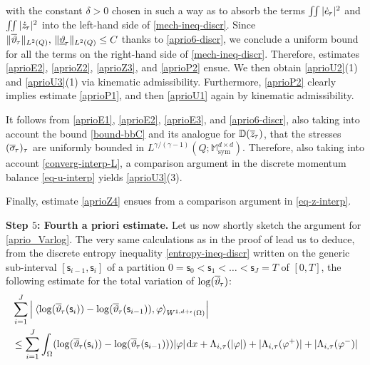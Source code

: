 \documentclass[a4paper,10pt,reqno]{amsart}
\numberwithin{equation}{section}
\newcommand{\bbM}{\mathbb{M}}
\numberwithin{equation}{section}
\def\dd{\;\!\mathrm{d}} %
\newcommand{\pairing}[4]{ \sideset{_{ #1 }}{_{ #2 }}  {\mathop{\langle #3 , #4
\rangle}}}
\newcommand{\teta}{\vartheta}
\newcommand{\piecewiseConstant}[2]{\overline{#1}_{\kern-1pt#2}}
\newcommand{\pwc}{\piecewiseConstant}
\newcommand{\upiecewiseConstant}[2]{\underline{#1}_{\kern-1pt#2}}
\newcommand{\upwc}{\upiecewiseConstant}
\newcommand{\piecewiseLinear}[2]{{#1}_{\kern-1pt#2}}
\newcommand{\pwl}{\piecewiseLinear}
\newcommand{\bbD}{\mathbb{D}}
\newcommand{\mt}{\bbM}
\newcommand{\sym}{\mathrm{sym}}
\newcommand{\EEE}{\color{black}}
\begin{document}
  with the constant $\delta>0$ chosen in such a way as to absorb the terms $\iint   | \pwl{\dot e}\tau |^2$ and
$  \iint   | \pwl{\dot z}\tau |^2$ 
    into the left-hand side of  \eqref{mech-ineq-discr}. 
  Since $ \| \pwc \teta \tau \|_{L^2(Q)},\,  \| \upwc \teta \tau \|_{L^2(Q)}  \leq C$ thanks to  \eqref{aprio6-discr},  we conclude a uniform bound 
for all   
 the  terms on the right-hand side of  \eqref{mech-ineq-discr}. Therefore, estimates 
  \eqref{aprioE2},  \eqref{aprioZ2},  \eqref{aprioZ3}, 
  and \eqref{aprioP2} ensue. 
  We then obtain  \eqref{aprioU2}(1) and \eqref{aprioU3}(1)  via   kinematic admissibility. Furthermore, 
  \eqref{aprioP2} clearly implies estimate
\eqref{aprioP1}, and then  \eqref{aprioU1} again by kinematic admissibility. 
\par
It follows from  \eqref{aprioE1}, \eqref{aprioE2}, \eqref{aprioE3}, and  \eqref{aprio6-discr}, also taking into account the bound  \eqref{bound-bbC} and its analogue for $\bbD(\pwc z\tau)$, 
 that the stresses $(\pwc \sigma\tau )_\tau$ are uniformly bounded in
$L^{\gamma/(\gamma{-}1)}(Q; \mt_\sym^{d\times d})$. Therefore, also taking into account \eqref{converg-interp-L},    a comparison argument in the discrete momentum balance  \eqref{eq-u-interp} yields  
\eqref{aprioU3}(3).
\par
Finally, estimate \eqref{aprioZ4} ensues from a comparison argument in \eqref{eq-z-interp}. %
\par\noindent 
\textbf{Step $5$: Fourth a priori estimate. } Let us now shortly sketch the argument for \eqref{aprio_Varlog}.
The very same calculations as in the proof of \cite[Prop.\ 4.10]{Rocca-Rossi}
lead us to deduce, from  the discrete  entropy inequality
\eqref{entropy-ineq-discr} written on
the generic sub-interval  $[\mathsf{s}_{i-1},\mathsf{s}_i]$ of a partition $0 =\mathsf{s}_0 < \mathsf{s}_1 < \ldots < \mathsf{s}_J =T$ of  $[0,T]$,
 the following estimate  for the total variation of $\log(\pwc\teta\tau)$:
\begin{equation}
\label{genialata}
\begin{aligned} & 
\sum_{i=1}^J \left|  \pairing{}{W^{1,d+\epsilon}(\Omega)}{\log(\pwc\teta\tau (\mathsf{s}_{i}))  - \log(\pwc\teta\tau (\mathsf{s}_{i-1})) }{\varphi} \right| 
\\ & \leq  \sum_{i=1}^J   %
\int_\Omega (\log(\pwc\teta\tau (\mathsf{s}_{i}))  - \log(\pwc\teta\tau (\mathsf{s}_{i-1}))) |\varphi| \dd x
+ \Lambda_{i,\tau} (|\varphi|) + |\Lambda_{i,\tau} (\varphi^+)| + |\Lambda_{i,\tau} (\varphi^-)| 
\end{aligned} 
\end{equation}
\end{document}
